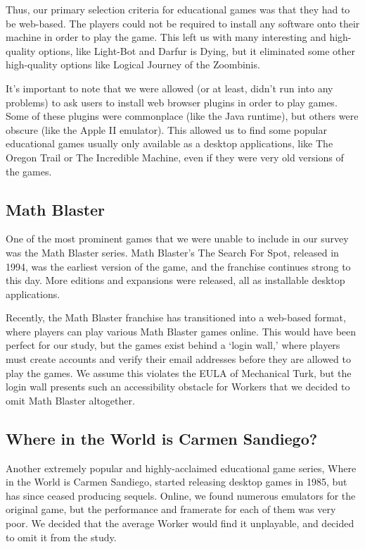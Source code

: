 \documentclass[12pt]{report}
\begin{document}
			Thus, our primary selection criteria for educational games was that they had to be web-based. The players could not be required to install any software onto their machine in order to play the game. This left us with many interesting and high-quality options, like Light-Bot and Darfur is Dying, but it eliminated some other high-quality options like Logical Journey of the Zoombinis.

			It's important to note that we were allowed (or at least, didn't run into any problems) to ask users to install web browser plugins in order to play games. Some of these plugins were commonplace (like the Java runtime), but others were obscure (like the Apple II emulator). This allowed us to find some popular educational games usually only available as a desktop applications, like The Oregon Trail or The Incredible Machine, even if they were very old versions of the games.

		\subsection{Math Blaster}
			One of the most prominent games that we were unable to include in our survey was the Math Blaster series. Math Blaster's The Search For Spot, released in 1994, was the earliest version of the game, and the franchise continues strong to this day. More editions and expansions were released, all as installable desktop applications.

			Recently, the Math Blaster franchise has transitioned into a web-based format, where players can play various Math Blaster games online. This would have been perfect for our study, but the games exist behind a `login wall,' where players must create accounts and verify their email addresses before they are allowed to play the games. We assume this violates the EULA of Mechanical Turk, but the login wall presents such an accessibility obstacle for Workers that we decided to omit Math Blaster altogether. 

		\subsection{Where in the World is Carmen Sandiego?}
			Another extremely popular and highly-acclaimed educational game series, Where in the World is Carmen Sandiego, started releasing desktop games in 1985, but has since ceased producing sequels. Online, we found numerous emulators for the original game, but the performance and framerate for each of them was very poor. We decided that the average Worker would find it unplayable, and decided to omit it from the study.
\end{document}
